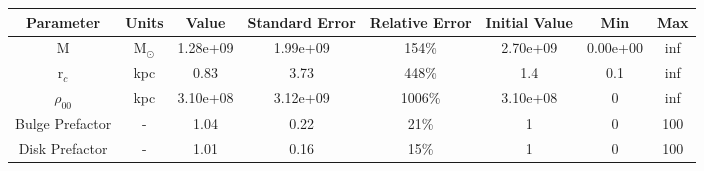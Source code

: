 \begin{tabular}[c]{| c | c | c | c | c | c | c | c |} 
\hline 
    \textbf{Parameter} & \textbf{Units} & \textbf{Value} & \textbf{Standard Error} & \textbf{Relative Error} & \textbf{Initial Value} & \textbf{Min} & \textbf{Max} \\ \hline 
    M & M$_\odot$ & 1.28e+09 & 1.99e+09 & 154\% & 2.70e+09 & 0.00e+00 & inf \\ \hline 
    r$_c$ & kpc & 0.83 & 3.73 & 448\% & 1.4 & 0.1 & inf \\ \hline 
    $\rho_{00}$ & kpc & 3.10e+08 & 3.12e+09 & 1006\% & 3.10e+08 & 0 & inf \\ \hline 
    Bulge Prefactor & - & 1.04 & 0.22 & 21\% & 1 & 0 & 100 \\ \hline 
    Disk Prefactor & - & 1.01 & 0.16 & 15\% & 1 & 0 & 100 \\ \hline 
\end{tabular} 
